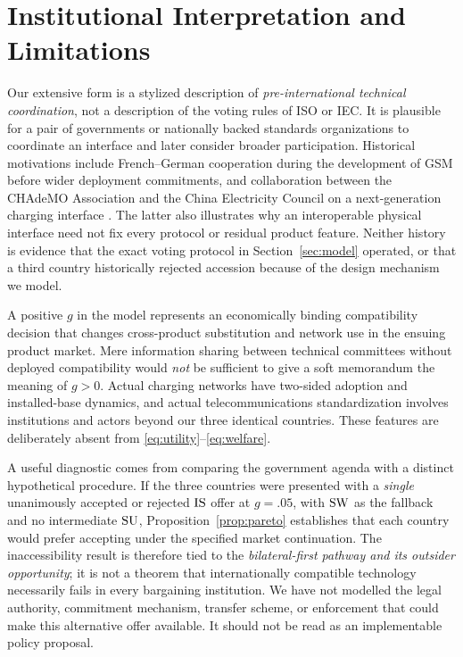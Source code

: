 \section{Institutional Interpretation and Limitations}
\label{sec:discussion}

Our extensive form is a stylized description of
\emph{pre-international technical coordination},
not a description of the voting rules of ISO or
IEC. It is plausible for a pair of governments
or nationally backed standards organizations to
coordinate an interface and later consider
broader participation. Historical motivations
include French--German cooperation during the
development of GSM before wider deployment
commitments, and collaboration between the
CHAdeMO Association and the China Electricity
Council on a next-generation charging interface
\citep{GSMAHistory,CHAdeMO2020}.
The latter also illustrates why an interoperable
physical interface need not fix every protocol
or residual product feature. Neither history
is evidence that the exact voting protocol in
Section~\ref{sec:model} operated, or that a
third country historically rejected accession
because of the design mechanism we model.

A positive $g$ in the model represents an
economically binding compatibility decision
that changes cross-product substitution and
network use in the ensuing product market.
Mere information sharing between technical
committees without deployed compatibility
would \emph{not} be sufficient to give a
soft memorandum the meaning of $g>0$.
Actual charging networks have two-sided
adoption and installed-base dynamics, and
actual telecommunications standardization
involves institutions and actors beyond
our three identical countries. These features
are deliberately absent from
\eqref{eq:utility}--\eqref{eq:welfare}.

A useful diagnostic comes from comparing the
government agenda with a distinct hypothetical
procedure. If the three countries were presented
with a \emph{single} unanimously accepted or
rejected $\mathrm{IS}$ offer at $g=.05$, with $\mathrm{SW}$
as the fallback and no intermediate $\mathrm{SU}$,
Proposition~\ref{prop:pareto} establishes that
each country would prefer accepting under
the specified market continuation. The
inaccessibility result is therefore tied to
the \emph{bilateral-first pathway and its
outsider opportunity}; it is not a theorem
that internationally compatible technology
necessarily fails in every bargaining
institution. We have not modelled the
legal authority, commitment mechanism,
transfer scheme, or enforcement that could
make this alternative offer available.
It should not be read as an implementable
policy proposal.

